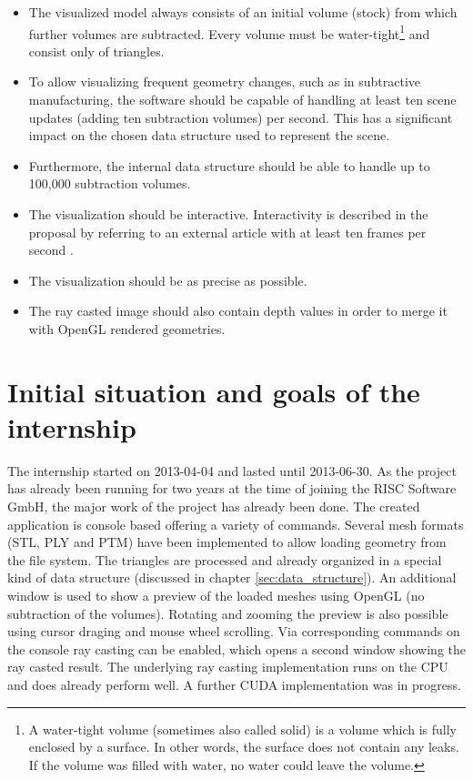 \begin{itemize}
	\item The visualized model always consists of an initial volume (stock) from which further volumes are subtracted. Every volume must be water-tight\footnote{A water-tight volume (sometimes also called solid) is a volume which is fully enclosed by a surface. In other words, the surface does not contain any leaks. If the volume was filled with water, no water could leave the volume.} and consist only of triangles.
	\item To allow visualizing frequent geometry changes, such as in subtractive manufacturing, the software should be capable of handling at least ten scene updates (adding ten subtraction volumes) per second. This has a significant impact on the chosen data structure used to represent the scene.
	\item Furthermore, the internal data structure should be able to handle up to 100,000 subtraction volumes.
	\item The visualization should be interactive. Interactivity is described in the proposal by referring to an external article with at least ten frames per second \cite{interactive_framerate}.
	\item The visualization should be as precise as possible.
	\item The ray casted image should also contain depth values in order to merge it with OpenGL rendered geometries.
\end{itemize}

\section{Initial situation and goals of the internship}
\label{sec:goals}

The internship started on 2013-04-04 and lasted until 2013-06-30. As the project has already been running for two years at the time of joining the RISC Software GmbH, the major work of the project has already been done. The created application is console based offering a variety of commands. Several mesh formats (STL, PLY and PTM) have been implemented to allow loading geometry from the file system. The triangles are processed and already organized in a special kind of data structure (discussed in chapter \ref{sec:data_structure}). An additional window is used to show a preview of the loaded meshes using OpenGL (no subtraction of the volumes). Rotating and zooming the preview is also possible using cursor draging and mouse wheel scrolling. Via corresponding commands on the console ray casting can be enabled, which opens a second window showing the ray casted result. The underlying ray casting implementation runs on the CPU and does already perform well. A further CUDA implementation was in progress.

